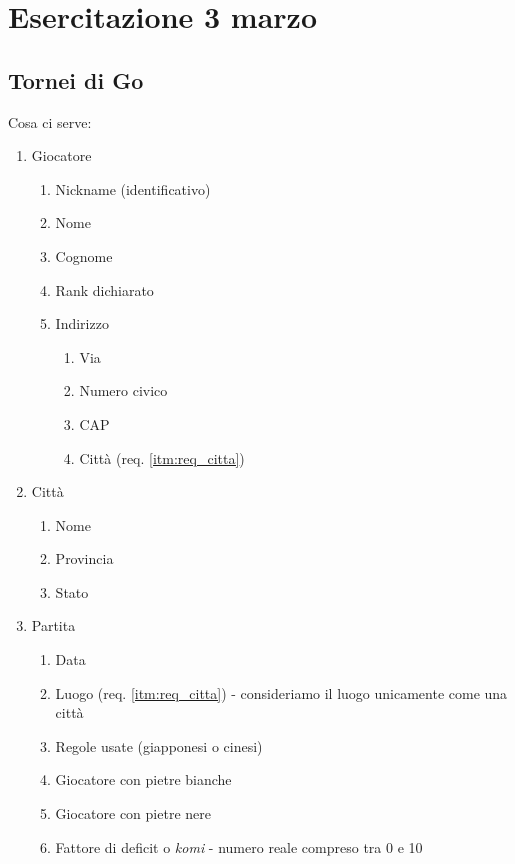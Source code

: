 \section{Esercitazione 3 marzo}

\subsection{Tornei di Go}

Cosa ci serve:
\begin{enumerate}
    \item Giocatore
    \begin{enumerate}[label*=\arabic*.]
        \item Nickname (identificativo)
        \item Nome
        \item Cognome
        \item Rank dichiarato
        \item Indirizzo
        \begin{enumerate}[label*=\arabic*.]
            \item Via
            \item Numero civico
            \item CAP
            \item Citt\`a (req. \ref{itm:req_citta})
        \end{enumerate}
    \end{enumerate}
    \item \label{itm:req_citta} Citt\`a
    \begin{enumerate}[label*=\arabic*.]
        \item Nome
        \item Provincia
        \item Stato
    \end{enumerate}
    \item \label{itm:partita} Partita
    \begin{enumerate}[label*=\arabic*.]
        \item Data
        \item Luogo (req. \ref{itm:req_citta}) - consideriamo il luogo unicamente come una citt\`a
        \item Regole usate (giapponesi o cinesi)
        \item Giocatore con pietre bianche
        \item Giocatore con pietre nere
        \item Fattore di deficit o \emph{komi} - numero reale compreso tra 0 e 10

\end{enumerate}
\end{enumerate}
